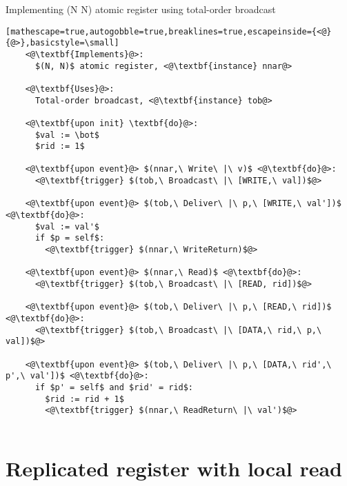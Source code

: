 \documentclass[a4paper]{scrreprt}
\begin{document}
\begin{library}{Implementing (N N) atomic register using total-order broadcast}
  \begin{lstlisting}[mathescape=true,autogobble=true,breaklines=true,escapeinside={<@}{@>},basicstyle=\small]
    <@\textbf{Implements}@>:
      $(N, N)$ atomic register, <@\textbf{instance} nnar@>

    <@\textbf{Uses}@>:
      Total-order broadcast, <@\textbf{instance} tob@>

    <@\textbf{upon init} \textbf{do}@>:
      $val := \bot$
      $rid := 1$

    <@\textbf{upon event}@> $(nnar,\ Write\ |\ v)$ <@\textbf{do}@>:
      <@\textbf{trigger} $(tob,\ Broadcast\ |\ [WRITE,\ val])$@>

    <@\textbf{upon event}@> $(tob,\ Deliver\ |\ p,\ [WRITE,\ val'])$ <@\textbf{do}@>:
      $val := val'$
      if $p = self$:
        <@\textbf{trigger} $(nnar,\ WriteReturn)$@>

    <@\textbf{upon event}@> $(nnar,\ Read)$ <@\textbf{do}@>:
      <@\textbf{trigger} $(tob,\ Broadcast\ |\ [READ, rid])$@>

    <@\textbf{upon event}@> $(tob,\ Deliver\ |\ p,\ [READ,\ rid])$ <@\textbf{do}@>:
      <@\textbf{trigger} $(tob,\ Broadcast\ |\ [DATA,\ rid,\ p,\ val])$@>

    <@\textbf{upon event}@> $(tob,\ Deliver\ |\ p,\ [DATA,\ rid',\ p',\ val'])$ <@\textbf{do}@>:
      if $p' = self$ and $rid' = rid$:
        $rid := rid + 1$
        <@\textbf{trigger} $(nnar,\ ReadReturn\ |\ val')$@>
      
  \end{lstlisting}
\end{library}


\section{Replicated register with local read}
\end{document}

